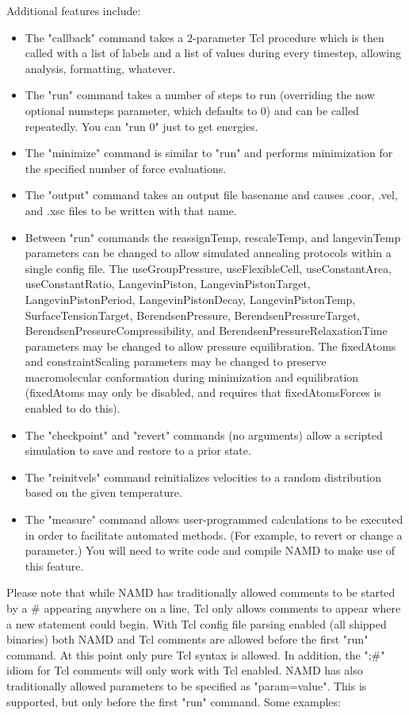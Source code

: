 Additional features include:
\begin{itemize}
 \item The "callback" command takes a 2-parameter Tcl procedure which
    is then called with a list of labels and a list of values during
    every timestep, allowing analysis, formatting, whatever.
 \item The "run" command takes a number of steps to run (overriding the
    now optional numsteps parameter, which defaults to 0) and can be
    called repeatedly.  You can "run 0" just to get energies.
 \item The "minimize" command is similar to "run" and performs
    minimization for the specified number of force evaluations.
 \item The "output" command takes an output file basename and causes
    .coor, .vel, and .xsc files to be written with that name.
 \item Between "run" commands the reassignTemp, rescaleTemp, and
    langevinTemp parameters can be changed to allow simulated
    annealing protocols within a single config file.
    The useGroupPressure, useFlexibleCell, useConstantArea, useConstantRatio,
    LangevinPiston, LangevinPistonTarget, LangevinPistonPeriod,
    LangevinPistonDecay, LangevinPistonTemp, SurfaceTensionTarget,
    BerendsenPressure, BerendsenPressureTarget,
    BerendsenPressureCompressibility, and BerendsenPressureRelaxationTime
    parameters may be changed to allow pressure equilibration.
    The fixedAtoms and constraintScaling parameters may be changed to
    preserve macromolecular conformation during minimization and
    equilibration (fixedAtoms may only be disabled, and requires that
    fixedAtomsForces is enabled to do this).
 \item The "checkpoint" and "revert" commands (no arguments) allow
    a scripted simulation to save and restore to a prior state.
 \item The "reinitvels" command reinitializes velocities to a
    random distribution based on the given temperature.
 \item The "measure" command allows user-programmed calculations to
    be executed in order to facilitate automated methods.  (For
    example, to revert or change a parameter.)  You will need to
    write code and compile NAMD to make use of this feature.
\end{itemize}

Please note that while NAMD has traditionally allowed comments to be
started by a \# appearing anywhere on a line, Tcl only allows comments
to appear where a new statement could begin.  With Tcl config file
parsing enabled (all shipped binaries) both NAMD and Tcl comments are
allowed before the first "run" command.  At this point only pure Tcl
syntax is allowed.  In addition, the ";\#" idiom for Tcl comments will
only work with Tcl enabled.  NAMD has also traditionally allowed
parameters to be specified as "param=value".  This is supported, but
only before the first "run" command.  Some examples:

